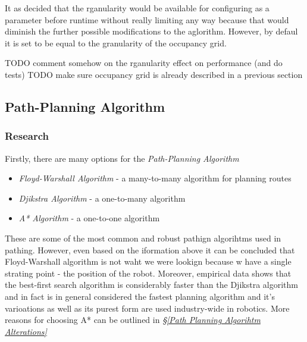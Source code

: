 \documentclass[11pt, a4paper]{article}
\begin{document}
It as decided that the rganularity would be available for configuring as a parameter before runtime without really limiting any way because that would diminish the further possible modifications to the aglorithm. However, by defaul it is set to be equal to the granularity of the occupancy grid. 

TODO comment somehow on the rganularity effect on performance (and do tests)
TODO make sure occupancy grid is already described in a previous section







\subsection{Path-Planning Algorithm}
\label{Path Planning Algorihtm }

\subsubsection{Research}

Firstly, there are many options for the \textit{Path-Planning Algorithm}

\begin{itemize}

	\item \textit{Floyd-Warshall Algorithm}\cite{path_warshall} - a many-to-many algorithm for planning routes
	\item \textit{Djikstra Algorithm}\cite{path_warshall} - a one-to-many algorithm
	\item \textit{A* Algorithm}\cite{path_astar}	- a one-to-one algorithm
\end{itemize}

These are some of the most common and robust pathign algorihtms used in pathing. However, even based on the iformation above it can be concluded that Floyd-Warshall algorithm is not waht we were lookign because w have a single strating point - the position of the robot. Moreover, empirical data\cite{path_efficiency} shows that the best-first search algorithm is considerably faster than the Djikstra algorithm and in fact is in general considered the fastest planning algorithm and it's varioations as well as its purest form are used industry-wide in robotics. More reasons for choosing A* can be outlined in \textit{\S\ref{Path Planning Algorihtm Alterations}}
\end{document}
